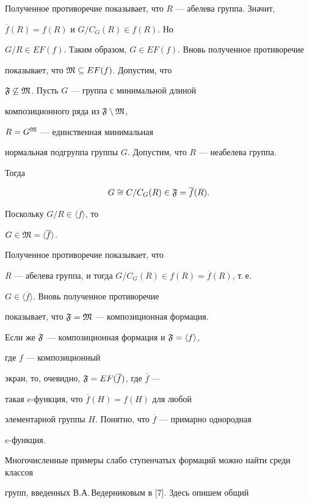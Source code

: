 \begin{pf}
Полученное противоречие показывает, что $R$ --- абелева группа. Значит,


$\overline f(R)=f(R)$ и $G/C_G(R)\in f(R)$. Но


$G/R\in EF(f)$. Таким образом, $G\in EF(f)$. Вновь полученное противоречие


показывает, что $\frak{M}\subseteq EF(f)$. Допустим, что


$\frak{F}\not\subseteq\frak{M}$. Пусть $G$ --- группа с минимальной длиной


композиционного ряда из $\frak{F}\setminus\frak{M}$,


$R=G^{\frak{M}}$ --- единственная минимальная


нормальная подгруппа группы $G$. Допустим, что $R$ --- неабелева группа.


Тогда


$$


G\cong C/C_G(R)\in\frak{F}=\overline f(R).


$$


Поскольку $G/R\in\langle\overline f\rangle$, то


$G\in\frak{M}=\langle\overline f\rangle$.


Полученное противоречие показывает, что


$R$ --- абелева группа, и тогда $G/C_G(R)\in f(R)=\overline f(R)$, т.\,е.


$G\in\langle\overline f\rangle$. Вновь полученное противоречие


показывает, что $\frak{F}=\frak{M}$ --- композиционная формация.





Если же $\frak{F}$ --- композиционная формация и $\frak{F}=\langle f\rangle$,


где $f$ --- композиционный


экран, то, очевидно, $\frak{F}=EF(\overline f)$, где $\overline f$ ---


такая $e$-функция, что $\overline f(H)=f(H)$ для любой


элементарной группы $H$. Понятно, что $\overline f$ --- примарно однородная


$e$-функция.


\end{pf}





Многочисленные примеры слабо ступенчатых формаций можно найти среди классов


групп, введенных В.А.\,Ведерниковым в [7]. Здесь опишем общий


